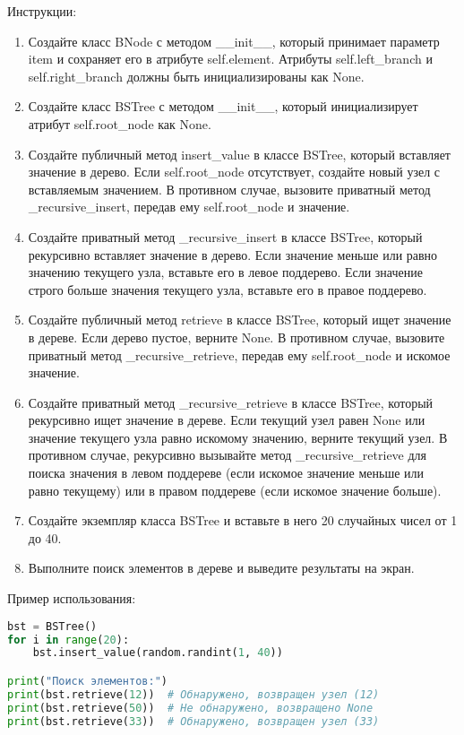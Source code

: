 \begin{enumerate}
Инструкции:
\begin{enumerate}
    \item Создайте класс BNode с методом \_\_init\_\_, который принимает параметр item и сохраняет его в атрибуте self.element. Атрибуты self.left\_branch и self.right\_branch должны быть инициализированы как None.
    \item Создайте класс BSTree с методом \_\_init\_\_, который инициализирует атрибут self.root\_node как None.
    \item Создайте публичный метод insert\_value в классе BSTree, который вставляет значение в дерево. Если self.root\_node отсутствует, создайте новый узел с вставляемым значением. В противном случае, вызовите приватный метод \_recursive\_insert, передав ему self.root\_node и значение.
    \item Создайте приватный метод \_recursive\_insert в классе BSTree, который рекурсивно вставляет значение в дерево. Если значение меньше или равно значению текущего узла, вставьте его в левое поддерево. Если значение строго больше значения текущего узла, вставьте его в правое поддерево.
    \item Создайте публичный метод retrieve в классе BSTree, который ищет значение в дереве. Если дерево пустое, верните None. В противном случае, вызовите приватный метод \_recursive\_retrieve, передав ему self.root\_node и искомое значение.
    \item Создайте приватный метод \_recursive\_retrieve в классе BSTree, который рекурсивно ищет значение в дереве. Если текущий узел равен None или значение текущего узла равно искомому значению, верните текущий узел. В противном случае, рекурсивно вызывайте метод \_recursive\_retrieve для поиска значения в левом поддереве (если искомое значение меньше или равно текущему) или в правом поддереве (если искомое значение больше).
    \item Создайте экземпляр класса BSTree и вставьте в него 20 случайных чисел от 1 до 40.
    \item Выполните поиск элементов в дереве и выведите результаты на экран.
\end{enumerate}

Пример использования:
\begin{lstlisting}[language=Python]
bst = BSTree()
for i in range(20):
    bst.insert_value(random.randint(1, 40))

print("Поиск элементов:")
print(bst.retrieve(12))  # Обнаружено, возвращен узел (12)
print(bst.retrieve(50))  # Не обнаружено, возвращено None
print(bst.retrieve(33))  # Обнаружено, возвращен узел (33)
\end{lstlisting}


\end{enumerate}
